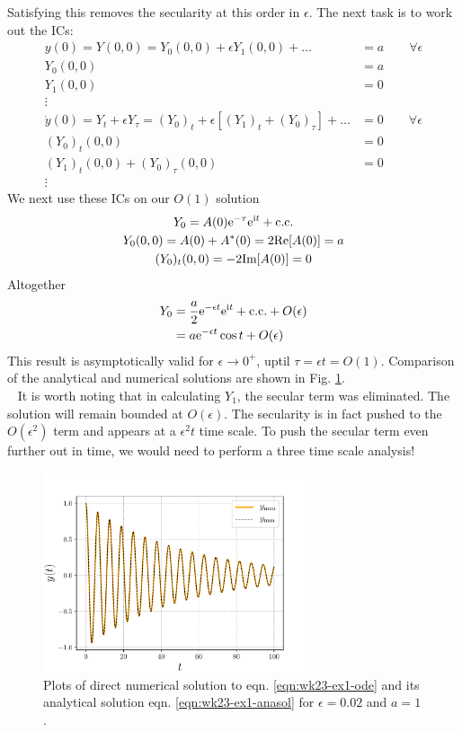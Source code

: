 Satisfying this removes the secularity at this order in $\epsilon$. The next task is to work out the ICs:
\begin{align*}
	y(0) = Y(0,0) = Y_0(0,0) + \epsilon Y_1(0,0) + \dots &= a \qquad \forall \epsilon \\
	Y_0(0,0) &= a \\ 
	Y_1(0,0) &= 0 \\
	\vdots \\
	\dot y(0) = Y_t+ \epsilon Y_\tau = (Y_0)_t + \epsilon [(Y_1)_t + (Y_0)_\tau] + \dots &= 0 \qquad \forall \epsilon\\
	(Y_0)_t(0,0) &= 0 \\
	(Y_1)_t(0,0) + (Y_0)_\tau(0,0) &= 0 \\
	\vdots 
\end{align*}
We next use these ICs on our $O(1)$ solution
\begin{gather*}
	Y_0 = A(0)\mathrm{e}^{-\tau} \mathrm{e}^{\mathrm{i} t} + \text{c.c.} \\
	Y_0(0,0) = A(0) + A^\ast(0) = 2 \text{Re}[A(0)] = a \\
	(Y_0)_t(0,0) = -2 \text{Im}[A(0)] = 0
\end{gather*}
Altogether
\begin{align}
	Y_0 &= \frac{a}{2} \mathrm{e}^{-\epsilon t} \mathrm{e}^{\mathrm{i} t} + \text{c.c.} + O(\epsilon) \nonumber \\
	&=a \mathrm{e}^{-\epsilon t} \cos t + O(\epsilon) \label{eqn:wk23-ex1-anasol}
\end{align}
This result is asymptotically valid for $\epsilon \rightarrow 0^+$, uptil $\tau = \epsilon t = O(1)$. Comparison of the analytical and numerical solutions are shown in Fig. \ref{fig:wk23-ex1}.\\
\ \newline
It is worth noting that in calculating $Y_1$, the secular term was eliminated. The solution will remain bounded at $O(\epsilon)$. The secularity is in fact pushed to the $O(\epsilon^2)$ term and appears at a $\epsilon^2 t$ time scale. To push the secular term even further out in time, we would need to perform a three time scale analysis!
\begin{figure}[!h]
	\centering
	\includegraphics[width=0.7\textwidth]{./plots/pdf/strogatz-wk23-ex1.pdf}
	\caption{Plots of direct numerical solution to eqn. \ref{eqn:wk23-ex1-ode} and its analytical solution eqn. \ref{eqn:wk23-ex1-anasol} for $\epsilon=0.02$ and $a=1$.}
	\label{fig:wk23-ex1}
\end{figure}\\

